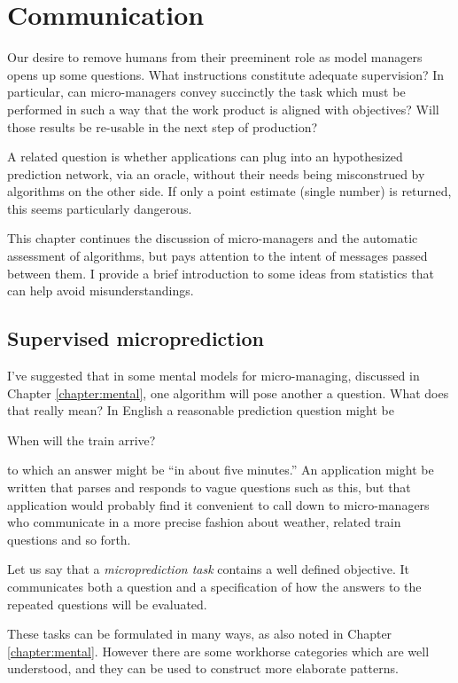 \chapter{Communication}
\label{chapter:scoring}

Our desire to remove humans from their preeminent role as model managers opens up some questions. What instructions constitute adequate supervision? In particular, can micro-managers convey succinctly the task which must be performed in such a way that the work product is aligned with objectives? Will those results be re-usable in the next step of production? 

A related question is whether applications can plug into an hypothesized prediction network, via an oracle, without their needs being misconstrued by algorithms on the other side. If only a point estimate (single number) is returned, this seems particularly dangerous. 

This chapter continues the discussion of micro-managers and the automatic assessment of algorithms, but pays attention to the intent of messages passed between them. I provide a brief introduction to some ideas from statistics that can help avoid misunderstandings.




\section{Supervised microprediction}

I've suggested that in some mental models for micro-managing, discussed in Chapter \ref{chapter:mental}, one algorithm will pose another a question. What does that really mean? In English a reasonable prediction question might be 
\begin{oldquote}
    When will the train arrive? 
\end{oldquote}
to which an answer might be ``in about five minutes.'' An application might be written that parses and responds to vague questions such as this, but that application would probably find it convenient to call down to micro-managers who communicate in a more precise fashion about weather, related train questions and so forth. 

Let us say that a {\em microprediction task} contains a well defined objective. It communicates both a question and a specification of how the answers to the repeated questions will be evaluated. 

These tasks can be formulated in many ways, as also noted in Chapter \ref{chapter:mental}. However there are some workhorse categories which are well understood, and they can be used to construct more elaborate patterns. 

